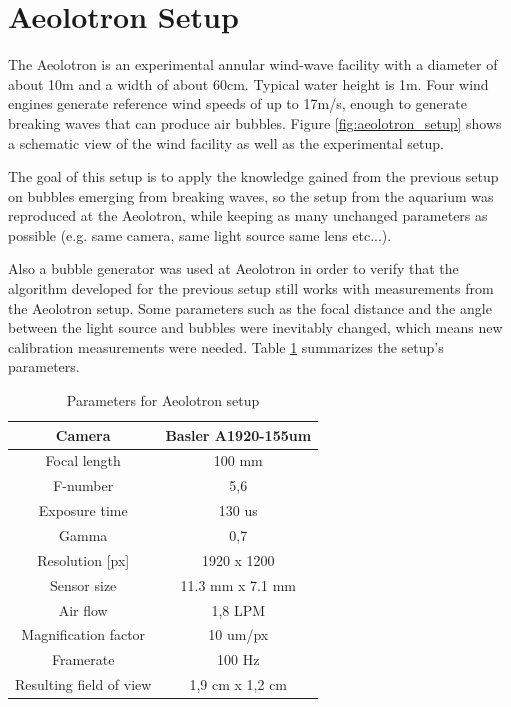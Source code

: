	\section{Aeolotron Setup}
		The Aeolotron is an experimental annular wind-wave facility with a diameter of about 10m and a width of about 60cm. Typical water height is 1m. Four wind engines generate reference wind speeds of up to 17m/s, enough to generate breaking waves that can produce air bubbles. Figure \ref{fig:aeolotron_setup} shows a schematic view of the wind facility as well as the experimental setup.
		
		The goal of this setup is to apply the knowledge gained from the previous setup on bubbles emerging from breaking waves, so the setup from the aquarium was reproduced at the Aeolotron, while keeping as many unchanged parameters as possible (e.g. same camera, same light source same lens etc...).
		
	Also a bubble generator was used at Aeolotron in order to verify that the algorithm developed for the previous setup still works with measurements from the Aeolotron setup. Some parameters such as the focal distance and the angle between the light source and bubbles were inevitably changed, which means new calibration measurements were needed. Table \ref{tab:aeolotron_setup} summarizes the setup's parameters.
	
		\begin{table}
			\centering
		
			\begin{tabular}{|c|c|}
			\hline 
			Camera & Basler A1920-155um \\ 
			\hline 
			Focal length & 100 mm \\ 
			\hline 
			F-number & 5,6 \\ 
			\hline 
			Exposure time & 130 us \\ 
			\hline 
			Gamma & 0,7 \\
			\hline
			Resolution [px] &1920 x 1200 \\
			\hline 
			Sensor size & 11.3 mm x 7.1 mm \\
			\hline
			Air flow & 1,8 LPM  \\ 
			\hline 
			Magnification factor & 10 um/px \\ 
			\hline 
			Framerate & 100 Hz \\ 
			\hline 
			Resulting field of view & 1,9 cm x 1,2 cm \\
			\hline
			\end{tabular} 
			
			\caption{Parameters for Aeolotron setup}
			\label{tab:aeolotron_setup}

		\end{table}
		
